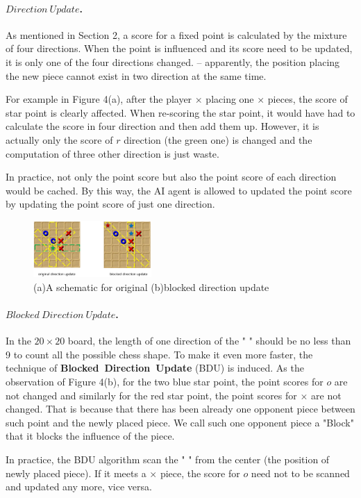 \documentclass[final]{cvpr}
\newcommand{\mypara}[1]{\paragraph{#1.}}
\begin{document}
\mypara{$Direction\ Update$}
%
As mentioned in Section 2, a score for a fixed point is calculated by the mixture of four directions.
%
When the point is influenced and its score need to be updated, 
it is only one of the four directions changed.
%
-- apparently, the position placing the new piece cannot exist in two direction at the same time.

%
For example in Figure 4(a), after the player $\times$ placing one $\times$ pieces, 
the score of star point is clearly affected. 
%
When re-scoring the star point,
it would have had to calculate the score in four direction and then add them up.
%
However, it is actually only the score of $r$ direction (the green one) is changed 
and the computation of three other direction is just waste.
%

In practice, not only the point score but also the point score of each direction would be cached. 
%
By this way, the AI agent is allowed to updated the point score by updating the point score of just one direction.

\begin{figure}[htbp]
\centering 
\includegraphics[width=0.4\textwidth]{figures/pic4.png} 
\caption{(a)A schematic for original (b)blocked direction update} 
\label{Fig.main6} %
\end{figure}


\mypara{$Blocked\ Direction\ Update$}
%
In the $20 \times 20$ board, the length of one direction of the 
" {\ooalign{$\times$\cr\hidewidth$+$\hidewidth\cr}} "
should be no less than 9 to count all the possible chess shape.
%
To make it even more faster, the technique of \textbf{Blocked\ Direction\ Update} (BDU) is induced.
%
As the observation of Figure 4(b), for the two blue star point, 
the point scores for $o$ are not changed and similarly for the red star point, 
the point scores for $\times$ are not changed.
%
That is because that there has been already one opponent piece between such point and the newly placed piece.
%
We call such one opponent piece a "Block" that it blocks the influence of the piece.
%

%
In practice, the BDU algorithm scan the
" {\ooalign{$\times$\cr\hidewidth$+$\hidewidth\cr}} "
from the center (the position of newly placed piece). 
%
If it meets a $\times$ piece, the score for $o$ need not to be scanned and updated any more, vice versa.
\end{document}
